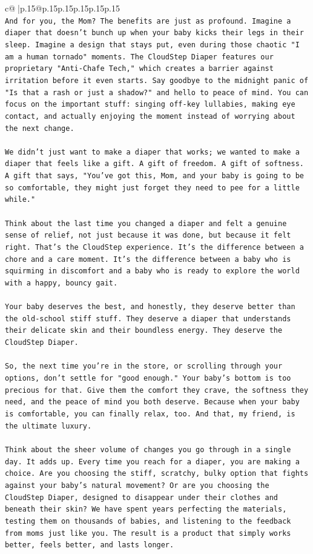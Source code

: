 \documentclass{article}
\begin{document}
{\begin{supertabular}{c@{$\;$}|p{.15\linewidth}@{}p{.15\linewidth}p{.15\linewidth}p{.15\linewidth}p{.15\linewidth}p{.15\linewidth}}
{{{\\ 
\texttt{And for you, the Mom? The benefits are just as profound. Imagine a diaper that doesn't bunch up when your baby kicks their legs in their sleep. Imagine a design that stays put, even during those chaotic "I am a human tornado" moments. The CloudStep Diaper features our proprietary "Anti{-}Chafe Tech," which creates a barrier against irritation before it even starts. Say goodbye to the midnight panic of "Is that a rash or just a shadow?" and hello to peace of mind. You can focus on the important stuff: singing off{-}key lullabies, making eye contact, and actually enjoying the moment instead of worrying about the next change.} \\
\\ 
\texttt{We didn't just want to make a diaper that works; we wanted to make a diaper that feels like a gift. A gift of freedom. A gift of softness. A gift that says, "You've got this, Mom, and your baby is going to be so comfortable, they might just forget they need to pee for a little while."} \\
\\ 
\texttt{Think about the last time you changed a diaper and felt a genuine sense of relief, not just because it was done, but because it felt right. That's the CloudStep experience. It's the difference between a chore and a care moment. It's the difference between a baby who is squirming in discomfort and a baby who is ready to explore the world with a happy, bouncy gait.} \\
\\ 
\texttt{Your baby deserves the best, and honestly, they deserve better than the old{-}school stiff stuff. They deserve a diaper that understands their delicate skin and their boundless energy. They deserve the CloudStep Diaper.} \\
\\ 
\texttt{So, the next time you're in the store, or scrolling through your options, don't settle for "good enough." Your baby's bottom is too precious for that. Give them the comfort they crave, the softness they need, and the peace of mind you both deserve. Because when your baby is comfortable, you can finally relax, too. And that, my friend, is the ultimate luxury.} \\
\\ 
\texttt{Think about the sheer volume of changes you go through in a single day. It adds up. Every time you reach for a diaper, you are making a choice. Are you choosing the stiff, scratchy, bulky option that fights against your baby's natural movement? Or are you choosing the CloudStep Diaper, designed to disappear under their clothes and beneath their skin? We have spent years perfecting the materials, testing them on thousands of babies, and listening to the feedback from moms just like you. The result is a product that simply works better, feels better, and lasts longer.} \\
}}}
\end{supertabular}}
\end{document}
